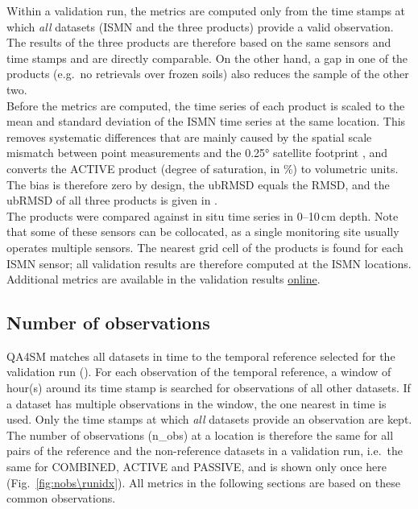 \noindent Within a validation run, the metrics are computed only from the time stamps at which \textit{all} datasets (\ac{ISMN} and the three products) provide a valid observation.
The results of the three products are therefore based on the same sensors and time stamps and are directly comparable.
On the other hand, a gap in one of the products (e.g.\ no retrievals over frozen soils) also reduces the sample of the other two.
\\[1em]
\noindent Before the metrics are computed, the time series of each product is scaled to the mean and standard deviation of the \ac{ISMN} time series at the same location.
This removes systematic differences that are mainly caused by the spatial scale mismatch between point measurements and the 0.25° satellite footprint \citep{gruber2020}, and converts the ACTIVE product (degree of saturation, in \%) to volumetric units.
The bias is therefore zero by design, the \ac{ubRMSD} equals the RMSD, and the \ac{ubRMSD} of all three products is given in \unitsm{}.
\\[1em]
\noindent The products were compared against \textbf{} in situ time series in 0--10\,cm depth.
Note that some of these sensors can be collocated, as a single monitoring site usually operates multiple sensors.
The nearest grid cell of the products is found for each \ac{ISMN} sensor; all validation results are therefore computed at the \ac{ISMN} locations.
Additional metrics are available in the validation results \href{\detokenize{$<ContentVars['NetcdfMetaVars']['url']>$}}{online}.

\FloatBarrier

\subsection{Number of observations} \label{ssec:results_nobs}

\noindent \ac{QA4SM} matches all datasets in time to the temporal reference selected for the validation run (\textbf{}).
For each observation of the temporal reference, a window of  hour(s) around its time stamp is searched for observations of all other datasets.
If a dataset has multiple observations in the window, the one nearest in time is used.
Only the time stamps at which \textit{all} datasets provide an observation are kept.
The number of observations (n\_obs) at a location is therefore the same for all pairs of the reference and the non-reference datasets in a validation run, i.e.\ the same for COMBINED, ACTIVE and PASSIVE, and is shown only once here (Fig.\ \ref{fig:nobs\runidx}).
All metrics in the following sections are based on these common observations.

